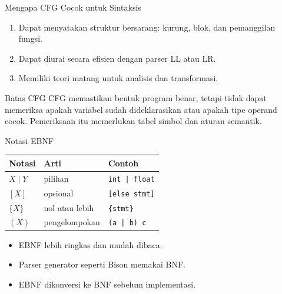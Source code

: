 \documentclass[aspectratio=169,10pt,t]{beamer}
\begin{document}
\begin{frame}{Mengapa CFG Cocok untuk Sintaksis}
  \begin{enumerate}
    \setlength{\itemsep}{4pt}
    \item Dapat menyatakan struktur bersarang: kurung, blok, dan
          pemanggilan fungsi.
    \item Dapat diurai secara efisien dengan parser LL atau LR.
    \item Memiliki teori matang untuk analisis dan transformasi.
  \end{enumerate}

  \vspace{6pt}
  \begin{block}{Batas CFG}
    \footnotesize
    CFG memastikan bentuk program benar, tetapi tidak dapat memeriksa
    apakah variabel sudah dideklarasikan atau apakah tipe operand
    cocok. Pemeriksaan itu memerlukan tabel simbol dan aturan semantik.
  \end{block}
\end{frame}

\begin{frame}{Notasi EBNF}
  \small
  \setlength{\tabcolsep}{4pt}
  \begin{tabular}{@{}p{2.6cm}p{3.4cm}p{7.6cm}@{}}
    \toprule
    \textbf{Notasi} & \textbf{Arti} & \textbf{Contoh} \\
    \midrule
    \(X \mid Y\) & pilihan & \texttt{int | float} \\
    \([X]\) & opsional & \texttt{[else stmt]} \\
    \(\{X\}\) & nol atau lebih & \texttt{\{stmt\}} \\
    \((X)\) & pengelompokan & \texttt{(a | b) c} \\
    \bottomrule
  \end{tabular}

  \vspace{5pt}
  \begin{itemize}
    \item EBNF lebih ringkas dan mudah dibaca.
    \item Parser generator seperti Bison memakai BNF.
    \item EBNF dikonversi ke BNF sebelum implementasi.
  \end{itemize}
\end{frame}
\end{document}
